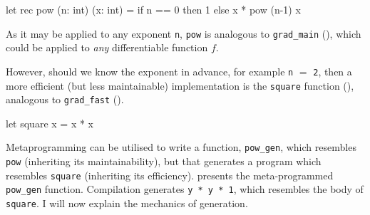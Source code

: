 \begin{code}
\begin{ocamllst}
let rec pow (n: int) (x: int) = 
  if n == 0 then 1 
  else x * pow (n-1) x
\end{ocamllst}
\label{listing:ocaml-pow-maintainable}
\end{code}

As it may be applied to any exponent \texttt{n}, \texttt{pow} is analogous to \texttt{grad_main} (), which could be applied to \textit{any} differentiable function $f$. 

However, should we know the exponent in advance, for example \texttt{n} $ =$ \texttt{2}, then a more efficient (but less maintainable) implementation is the \texttt{square} function (), analogous to \texttt{grad_fast} ().

\begin{code}
\begin{ocamllst}
let square x = x * x
\end{ocamllst}
\label{listing:ocaml-pow-fast}
\end{code}

Metaprogramming can be utilised to write a function, \texttt{pow_gen}, which resembles \texttt{pow} (inheriting its maintainability), but that generates a program which resembles \texttt{square} (inheriting its efficiency).  presents the meta-programmed \texttt{pow_gen} function. Compilation generates \texttt{y * y * 1}, which resembles the body of \texttt{square}. I will now explain the mechanics of generation.

\begin{code}
\label{listing:ocaml-pow-gen}
\end{code}

